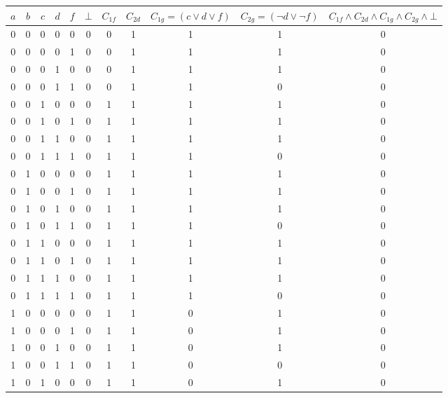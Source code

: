 \documentclass{article}
\begin{document}
\begin{enumerate}
    \begin{table}[h]
        \centering
        \begin{adjustbox}{center}
            \begin{tabular}{c c c c c c | c c c c | c}\toprule
                $a$ & $b$ & $c$ & $d$ & $f$ & $\bot$ & $C_{1f}$ & $C_{2d}$ & $C_{1g} = (c \lor d \lor f)$ & $C_{2g} = (\neg d \lor \neg f)$ & $C_{1f} \land C_{2d} \land C_{1g} \land C_{2g} \land \bot$ \\\midrule
                0 & 0 & 0 & 0 & 0 & 0 & 0 & 1 & 1 & 1 & 0 \\
                0 & 0 & 0 & 0 & 1 & 0 & 0 & 1 & 1 & 1 & 0 \\
                0 & 0 & 0 & 1 & 0 & 0 & 0 & 1 & 1 & 1 & 0 \\
                0 & 0 & 0 & 1 & 1 & 0 & 0 & 1 & 1 & 0 & 0 \\
                0 & 0 & 1 & 0 & 0 & 0 & 1 & 1 & 1 & 1 & 0 \\
                0 & 0 & 1 & 0 & 1 & 0 & 1 & 1 & 1 & 1 & 0 \\
                0 & 0 & 1 & 1 & 0 & 0 & 1 & 1 & 1 & 1 & 0 \\
                0 & 0 & 1 & 1 & 1 & 0 & 1 & 1 & 1 & 0 & 0 \\
                0 & 1 & 0 & 0 & 0 & 0 & 1 & 1 & 1 & 1 & 0 \\
                0 & 1 & 0 & 0 & 1 & 0 & 1 & 1 & 1 & 1 & 0 \\
                0 & 1 & 0 & 1 & 0 & 0 & 1 & 1 & 1 & 1 & 0 \\
                0 & 1 & 0 & 1 & 1 & 0 & 1 & 1 & 1 & 0 & 0 \\
                0 & 1 & 1 & 0 & 0 & 0 & 1 & 1 & 1 & 1 & 0 \\
                0 & 1 & 1 & 0 & 1 & 0 & 1 & 1 & 1 & 1 & 0 \\
                0 & 1 & 1 & 1 & 0 & 0 & 1 & 1 & 1 & 1 & 0 \\
                0 & 1 & 1 & 1 & 1 & 0 & 1 & 1 & 1 & 0 & 0 \\%
                1 & 0 & 0 & 0 & 0 & 0 & 1 & 1 & 0 & 1 & 0 \\
                1 & 0 & 0 & 0 & 1 & 0 & 1 & 1 & 0 & 1 & 0 \\
                1 & 0 & 0 & 1 & 0 & 0 & 1 & 1 & 0 & 1 & 0 \\
                1 & 0 & 0 & 1 & 1 & 0 & 1 & 1 & 0 & 0 & 0 \\
                1 & 0 & 1 & 0 & 0 & 0 & 1 & 1 & 0 & 1 & 0 \\

\end{tabular}
\end{adjustbox}
\end{table}
\end{enumerate}
\end{document}
